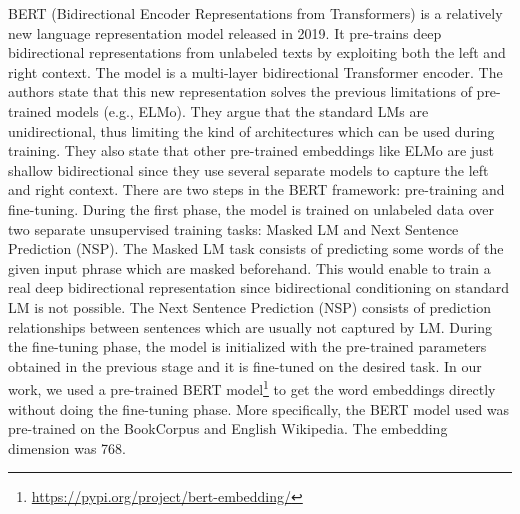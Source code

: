 \documentclass[11pt,a4paper]{article}
\begin{document}
BERT (Bidirectional Encoder Representations from Transformers) \cite{devlin2018bert} is a relatively new language representation model released in 2019. It pre-trains deep bidirectional representations from unlabeled texts by exploiting both the left and right context. The model is a multi-layer bidirectional Transformer encoder. The authors state that this new representation solves the previous limitations of pre-trained models (e.g., ELMo). They argue that the standard LMs are unidirectional, thus limiting the kind of architectures which can be used during training. They also state that other pre-trained embeddings like ELMo are just shallow bidirectional since they use several separate models to capture the left and right context.
There are two steps in the BERT framework: pre-training and fine-tuning. During the first phase, the model is trained on unlabeled data over two separate unsupervised training tasks: Masked LM and Next Sentence Prediction (NSP).  The Masked LM task consists of predicting some words of the given input phrase which are masked beforehand.  This would enable to train a real deep bidirectional representation since bidirectional conditioning on standard LM is not possible. The Next Sentence Prediction (NSP) consists of prediction relationships between sentences which are usually not captured by LM. 
During the fine-tuning phase, the model is initialized with the pre-trained parameters obtained in the previous stage and it is fine-tuned on the desired task. 
In our work, we used a pre-trained BERT model\footnote{\url{https://pypi.org/project/bert-embedding/}} to get the word embeddings directly without doing the fine-tuning phase. More specifically, the BERT model used was pre-trained on the BookCorpus \cite{moviebook} and English Wikipedia. The embedding dimension was 768.  
\end{document}
